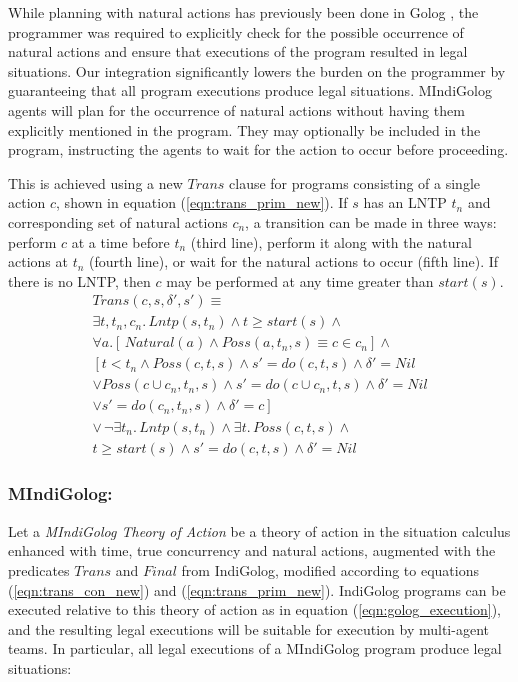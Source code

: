 \documentclass[letterpaper]{article}
\begin{document}
While planning with natural actions has previously been done in Golog
\cite{pirri00planning_nat_acts}, the programmer
was required to explicitly check for the possible occurrence of natural
actions and ensure that executions of the program resulted in legal
situations. Our integration significantly lowers the burden on the
programmer by guaranteeing that all program executions produce legal
situations.
MIndiGolog agents will plan for the occurrence of natural actions
without having them explicitly mentioned in the program.  They may
optionally be included in the program, instructing the agents to wait for
the action to occur before proceeding.

This is achieved using a new $Trans$ clause for programs consisting of a single
action $c$, shown in equation (\ref{eqn:trans_prim_new}).
If $s$ has an LNTP $t_n$ and corresponding
set of natural actions $c_n$, a transition can be made in three ways:
perform $c$ at a time before $t_n$ (third line), perform it along with
the natural actions at $t_n$ (fourth line), or wait for the natural
actions to occur (fifth line).  If there is no LNTP, then $c$ may be
performed at any time greater than $start(s)$.
\begin{multline}
\label{eqn:trans_prim_new}
Trans(c,s,\delta',s')\equiv \\
  \exists t,t_n,c_n.\,Lntp(s,t_n) \wedge t\geq start(s) \wedge\\
      \forall a.\left[\,Natural(a)\wedge Poss(a,t_n,s)\equiv c\in c_n\right]\wedge\\
      \left[ t<t_n\wedge Poss(c,t,s)\wedge s'=do(c,t,s)\wedge \delta'=Nil\right.\\
            \vee Poss(c\cup c_n,t_n,s)\wedge s'=do(c\cup c_n,t,s)\wedge \delta'=Nil\\
            \vee \left.s'=do(c_n,t_n,s)\wedge \delta'=c\right]\\
  \vee\,\neg\exists t_{n}.\,Lntp(s,t_{n})\wedge\exists t.\,Poss(c,t,s)\wedge\\
  t\geq start(s)\wedge s'=do(c,t,s)\wedge\delta'=Nil
\end{multline}

\subsubsection{MIndiGolog:}
Let a \emph{MIndiGolog Theory of Action} be a theory
of action in the situation calculus enhanced with time, true concurrency and
natural actions, augmented with the predicates $Trans$ and $Final$ from
IndiGolog, modified according to equations (\ref{eqn:trans_con_new}) and
(\ref{eqn:trans_prim_new}).
IndiGolog programs can be executed relative to this
theory of action as in equation (\ref{eqn:golog_execution}),
and the resulting legal
executions will be suitable for execution by multi-agent teams.
In particular, all legal executions of a MIndiGolog
program produce legal situations:
\end{document}
